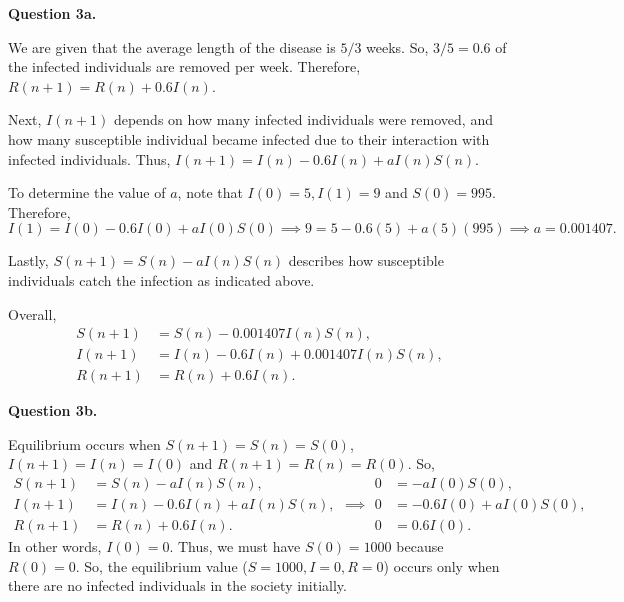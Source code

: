 \documentclass[11pt]{penrose}
\newenvironment{problem}[2][Question]{\textbf{#1 #2.}\par}{}
\begin{document}
\begin{problem}{3a}
    We are given that the average length of the disease is $5/3$ weeks. So, $3/5 = 0.6$ of the infected individuals are removed per week. Therefore, $R(n+1) = R(n) + 0.6I(n)$.

    Next, $I(n+1)$ depends on how many infected individuals were removed, and how many susceptible individual became infected due to their interaction with infected individuals. Thus, $I(n+1) = I(n) - 0.6I(n) + aI(n)S(n)$.

    To determine the value of $a$, note that $I(0) = 5, I(1) = 9$ and $S(0) = 995$. Therefore,
    \begin{equation*}
        I(1) = I(0) - 0.6I(0) + aI(0)S(0)
        \implies
        9 = 5 - 0.6(5) + a(5)(995)
        \implies
        a = 0.001407.
    \end{equation*}

    Lastly, $S(n+1) = S(n) - aI(n)S(n)$ describes how susceptible individuals catch the infection as indicated above.

    Overall,
    \begin{align*}
        S(n+1) &= S(n) - 0.001407I(n)S(n),\\
        I(n+1) &= I(n) - 0.6I(n) + 0.001407I(n)S(n),\\
        R(n+1) &= R(n) + 0.6I(n).
    \end{align*}
\end{problem}

\begin{problem}{3b}
    Equilibrium occurs when $S(n+1) = S(n) = S(0)$, $I(n+1) = I(n) = I(0)$ and $R(n+1) = R(n) = R(0)$. So,
    \begin{equation*}
        \begin{aligned}
            S(n+1) &= S(n) - aI(n)S(n),\\
            I(n+1) &= I(n) - 0.6I(n) + aI(n)S(n),\\
            R(n+1) &= R(n) + 0.6I(n).
        \end{aligned}
        \implies
        \begin{aligned}
            0 &= - aI(0)S(0),\\
            0 &= - 0.6I(0) + aI(0)S(0),\\
            0 &= 0.6I(0).
        \end{aligned}
    \end{equation*}
    In other words, $I(0) = 0$. Thus, we must have $S(0) = 1000$ because $R(0) = 0$. So, the equilibrium value ($S = 1000, I = 0, R = 0$) occurs only when there are no infected individuals in the society initially.
\end{problem}
\end{document}
